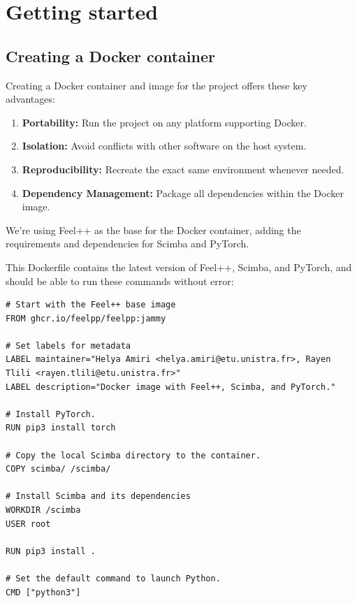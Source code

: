 \documentclass[12pt]{article}
\begin{document}
\newpage
\section{Getting started}  

\subsection{Creating a Docker container}
Creating a Docker container and image for the project offers these key advantages:

\begin{enumerate}
    \item \textbf{Portability:} Run the project on any platform supporting Docker.
    \item \textbf{Isolation:} Avoid conflicts with other software on the host system.
    \item \textbf{Reproducibility:} Recreate the exact same environment whenever needed.
    \item \textbf{Dependency Management:} Package all dependencies within the Docker image.
    \\
\end{enumerate}


We're using Feel++ as the base for the Docker container, adding the requirements and dependencies for Scimba and PyTorch.

This Dockerfile contains the latest version of Feel++, Scimba, and PyTorch, and should be able to run these commands without error:
\\
\begin{lstlisting}[language=docker,caption={Dockerfile for Feel++, Scimba, and PyTorch},frame=single, backgroundcolor=\color{gray!10}, basicstyle=\footnotesize,rulecolor=\color{blue}, framexleftmargin=3pt, commentstyle=\color{mygreen}, keywordstyle=\color{blue}]
# Start with the Feel++ base image
FROM ghcr.io/feelpp/feelpp:jammy

# Set labels for metadata
LABEL maintainer="Helya Amiri <helya.amiri@etu.unistra.fr>, Rayen Tlili <rayen.tlili@etu.unistra.fr>"
LABEL description="Docker image with Feel++, Scimba, and PyTorch."

# Install PyTorch.
RUN pip3 install torch

# Copy the local Scimba directory to the container.
COPY scimba/ /scimba/

# Install Scimba and its dependencies
WORKDIR /scimba
USER root

RUN pip3 install .

# Set the default command to launch Python.
CMD ["python3"]
\end{lstlisting}
\end{document}
